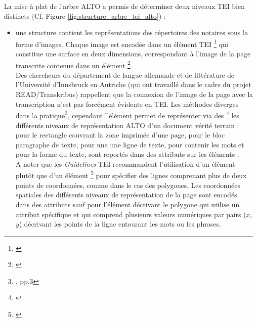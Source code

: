 La mise à plat de l'arbre ALTO a permis de déterminer deux niveaux TEI bien distincts (Cf. Figure \ref{fig:structure_arbre_tei_alto}) : 
\begin{itemize}
    \item une structure  contient les représentations des répertoires des notaires sous la forme d'images. Chaque image est encodée dans un élément TEI \footnote{\cite{tei_tei_nodate-15}} qui constitue une surface en deux dimensions, correspondant à l'image de la page transcrite contenue dans un élément \footnote{\cite{tei_tei_nodate-14}}.\\
    Des chercheurs du département de langue allemande et de littérature de l'Université d'Innsbruck en Autriche (qui ont travaillé dans le cadre du projet READ/Transkribus) rappellent que la connexion de l'image de la page avec la transcription n'est pas forcément évidente en TEI. Les méthodes diverges dans la pratique\footnote{\cite{muhlberger_preprint_nodate}, pp.3}, cependant l'élément  permet de représenter via des  \footnote{\cite{tei_tei_nodate-13}} les différents niveaux de représentation ALTO d'un document vérité terrain :  pour le rectangle couvrant la zone imprimée d'une page,  pour le bloc paragraphe de texte,  pour une une ligne de texte,  pour contenir les mots et  pour la forme du texte, sont reportés dans des attributs  sur les éléments .\\
    A noter que les \textit{Guidelines} TEI recommandent l'utilisation d'un élément  plutôt que d'un élément \footnote{\cite{tei_tei_nodate-12}} pour spécifier des lignes comprenant plus de deux points de coordonnées, comme dans le cas des polygones. Les coordonnées spatiales des différents niveaux de représentation de la page sont encodés dans des attributs  sauf pour l'élément  décrivant le polygone qui utilise un attribut  spécifique et qui comprend plusieurs valeurs numériques par pairs ($x$,$y$) décrivant les points de la ligne entourant les mots ou les phrases.
    \newpage

\end{itemize}
